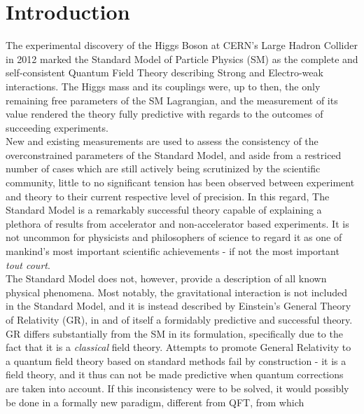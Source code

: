 \chapter*{Introduction}
\pagestyle{mystyle}
The experimental discovery of the Higgs Boson at 
CERN's Large Hadron Collider in 2012 \cite{HiggsCMS, HiggsATLAS} marked the 
Standard Model of Particle Physics (SM) as the complete and self-consistent 
Quantum Field Theory describing Strong and Electro-weak interactions.
The Higgs mass and its couplings were, up to then, the only remaining free parameters 
of the SM Lagrangian, and the measurement of its value rendered the theory fully 
predictive with regards to the outcomes of succeeding experiments.\\ 
New and existing measurements are used to assess the consistency of the 
overconstrained parameters of the Standard Model, and
aside from a restriced number of cases which are still actively being 
scrutinized by the scientific community, little to no significant tension has 
been observed between experiment and theory to their current respective level of
precision. In this regard, The Standard Model is a remarkably successful theory
capable of explaining a plethora of results from accelerator and
non-accelerator based experiments. It is not uncommon for physicists and 
philosophers of science to regard it as one of mankind's most important 
scientific achievements - if not the most important \textit{tout court}.\\
The Standard Model does not, however, provide a description of
all known physical phenomena. Most notably, the gravitational
interaction is not included in the Standard Model, and it is instead described 
by Einstein's General Theory of Relativity (GR), in and of itself a formidably 
predictive and successful theory. GR differs substantially from the SM in its
formulation, specifically due to the fact that it is a \textit{classical} field 
theory. Attempts to promote General Relativity to a quantum field theory based
on standard methods fail by construction - it is a 
field theory, and it thus can not be made predictive when quantum corrections
are taken into account. If this inconsistency were to be solved, it would 
possibly be done in a formally new paradigm, different from QFT, from which
